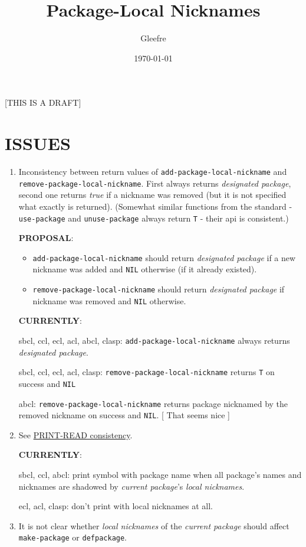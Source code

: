 \documentclass[11pt]{article}
\author{Gleefre}
\date{\today}
\title{Package-Local Nicknames}
\begin{document}
\maketitle
\tableofcontents

[THIS IS A DRAFT]

\section{ISSUES}
\label{sec:orge0b4034}
\begin{enumerate}
\item Inconsistency between return values of \texttt{add-package-local-nickname} and
\texttt{remove-package-local-nickname}. First always returns \emph{designated package},
second one returns \emph{true} if a nickname was removed (but it is not
specified what exactly is returned). (Somewhat similar functions from the
standard - \texttt{use-package} and \texttt{unuse-package} always return \texttt{T} - their api
is consistent.)

\textbf{PROPOSAL}:
\begin{itemize}
\item \texttt{add-package-local-nickname} should return \emph{designated package} if a new
nickname was added and \texttt{NIL} otherwise (if it already existed).
\item \texttt{remove-package-local-nickname} should return \emph{designated package} if
nickname was removed and \texttt{NIL} otherwise.
\end{itemize}

\textbf{CURRENTLY}:

sbcl, ccl, ecl, acl, abcl, clasp: \texttt{add-package-local-nickname} always returns
\emph{designated package}.

sbcl, ccl, ecl, acl, clasp: \texttt{remove-package-local-nickname} returns \texttt{T} on success
and \texttt{NIL}

abcl: \texttt{remove-package-local-nickname} returns package nicknamed by the
removed nickname on success and \texttt{NIL}.  [ That seems nice ]
\item See \hyperref[sec:orgfad362d]{PRINT-READ consistency}.

\textbf{CURRENTLY}:

sbcl, ccl, abcl: print symbol with package name when all package's names
and nicknames are shadowed by \emph{current package}'s \emph{local nicknames}.

ecl, acl, clasp: don't print with local nicknames at all.
\item It is not clear whether \emph{local nicknames} of the \emph{current package} should
affect \texttt{make-package} or \texttt{defpackage}.


\end{enumerate}
\end{document}
